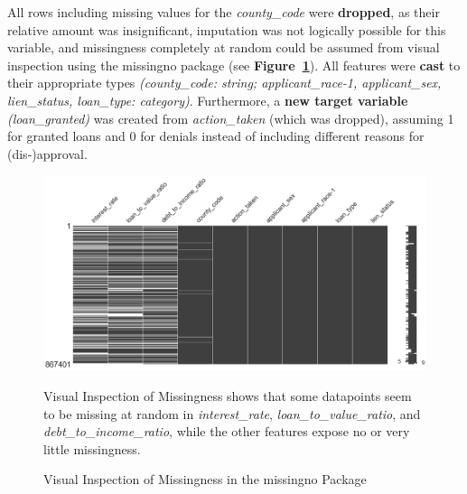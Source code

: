 All rows including missing values for the \textit{county\_code} were \textbf{dropped}, as their relative amount was insignificant, imputation was not logically possible for this variable, and missingness completely at random could be assumed from visual inspection using the missingno package (see \textbf{Figure~\ref{fig:CH03_Missingno_Completeness}}). 
All features were \textbf{cast} to their appropriate types \textit{(county\_code: string; applicant\_race-1, applicant\_sex, lien\_status, loan\_type: category)}. Furthermore, a \textbf{new target variable} \textit{(loan\_granted)} was created from \textit{action\_taken} (which was dropped), assuming 1 for granted loans and 0 for denials instead of including different reasons for (dis-)approval.

\begin{figure}[h]
    \centering
    \includegraphics[width=1\textwidth]{images/CH03_Missingno_Completeness.png}
    \caption{Visual Inspection of Missingness in the missingno Package}
    \medskip
    \small
    Visual Inspection of Missingness shows that some datapoints seem to be missing at random in \textit{interest\_rate}, \textit{loan\_to\_value\_ratio}, and \textit{debt\_to\_income\_ratio}, while the other features expose no or very little missingness.
    \label{fig:CH03_Missingno_Completeness}
\end{figure}

